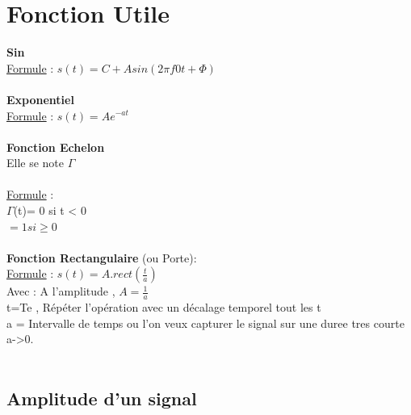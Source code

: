 \documentclass[a4paper,8pt,openany]{book}
\begin{document}
\chapter{Fonction Utile}

\textbf{Sin}\\
\underline{Formule} : $s(t)=C+ A sin(2\pi f0t + \Phi )$\\
\\

\textbf{Exponentiel}\\
\underline{Formule} : $s(t)=Ae^{-at}$\\
\\

\textbf{Fonction Echelon}\\
Elle se note $\Gamma$  \\
\\
\underline{Formule} :\\ 
$\Gamma$(t)= 0 si t < 0\\
          $= 1 si \geq 0 $\\
\\
\textbf{Fonction Rectangulaire} (ou Porte): \\
\underline{Formule} : $s(t)=A.rect(\frac{t}{a})$\\
Avec : A l'amplitude , $A=\frac{1}{a}$\\
t=Te , R\'ep\'eter l’op\'eration avec un d\'ecalage
temporel tout les t\\
a = Intervalle de temps ou l'on veux capturer le signal sur une duree tres courte a->0.\\
\\

\section{Amplitude d'un signal}
\end{document}
